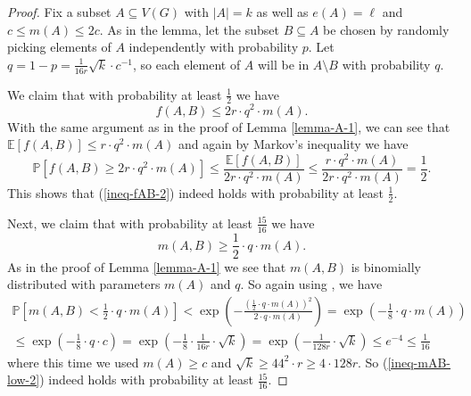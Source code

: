 \documentclass[11pt]{article}
\theoremstyle{definition}
\numberwithin{equation}{section}
\begin{document}
\begin{proof}Fix a subset $A\subseteq V(G)$ with $\vert A\vert=k$ as well as $e(A)=\ell$ and $c\leq m(A)\leq 2c$. As in the lemma, let the subset $B\subseteq A$ be chosen by randomly picking elements of $A$ independently with probability $p$. Let $q=1-p=\frac{1}{16r}\sqrt{k}\cdot c^{-1}$, so each element of $A$ will be in $A\setminus B$ with probability $q$.

We claim that with probability at least $\frac{1}{2}$ we have
\begin{equation}\label{ineq-fAB-2}
f(A,B)\leq 2r\cdot q^2 \cdot m(A).
\end{equation}
With the same argument as in the proof of Lemma \ref{lemma-A-1}, we can see that $\mathbb{E}[f(A,B)]\leq r\cdot q^2\cdot m(A)$ and again by Markov's inequality we have
\[\mathbb{P}[f(A,B)\geq 2r\cdot q^2\cdot m(A)]\leq \frac{\mathbb{E}[f(A,B)]}{2r\cdot q^2\cdot m(A)}\leq \frac{r\cdot q^2\cdot m(A)}{2r\cdot q^2\cdot m(A)}=\frac{1}{2}.\]
This shows that (\ref{ineq-fAB-2}) indeed holds with probability at least $\frac{1}{2}$.

Next, we claim that with probability at least $\frac{15}{16}$ we have
\begin{equation}\label{ineq-mAB-low-2}
m(A,B)\geq \frac{1}{2}\cdot q \cdot m(A).
\end{equation}
As in the proof of Lemma \ref{lemma-A-1} we see that $m(A,B)$ is binomially distributed with parameters $m(A)$ and $q$. So again using \cite[Theorem A.1.13]{alon-spencer}, we have 
\begin{multline*}
\mathbb{P}\left[m(A,B)< \frac{1}{2}\cdot q \cdot m(A)\right]<\exp\left(-\frac{\left(\frac{1}{2}\cdot q \cdot m(A)\right)^2}{2\cdot q\cdot m(A)}\right)=\exp\left(-\frac{1}{8}\cdot q\cdot m(A)\right)\\
\leq\exp\left(-\frac{1}{8}\cdot q\cdot c\right)=\exp\left(-\frac{1}{8}\cdot \frac{1}{16r}\cdot \sqrt{k}\right)=\exp\left(-\frac{1}{128r}\cdot \sqrt{k}\right)\leq e^{-4}\leq \frac{1}{16}
\end{multline*}
where this time we used $m(A)\geq c$ and $\sqrt{k}\geq 44^2 \cdot r\geq 4\cdot 128r$. So (\ref{ineq-mAB-low-2}) indeed holds with probability at least $\frac{15}{16}$.


\end{proof}
\end{document}
